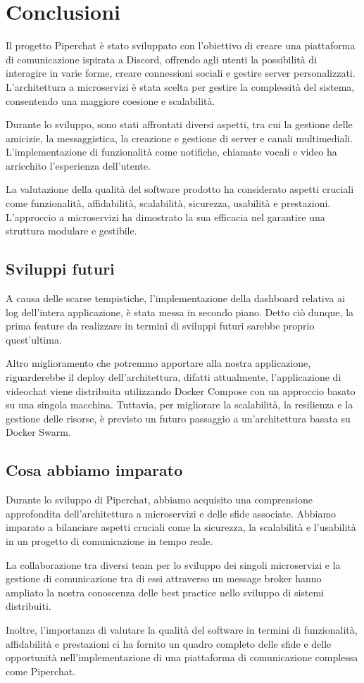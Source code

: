 \section{Conclusioni}

Il progetto Piperchat è stato sviluppato con l'obiettivo di creare una piattaforma di comunicazione ispirata a Discord, offrendo agli utenti la possibilità di interagire in varie forme, creare connessioni sociali e gestire server personalizzati. L'architettura a microservizi è stata scelta per gestire la complessità del sistema, consentendo una maggiore coesione e scalabilità.

Durante lo sviluppo, sono stati affrontati diversi aspetti, tra cui la gestione delle amicizie, la messaggistica, la creazione e gestione di server e canali multimediali. L'implementazione di funzionalità come notifiche, chiamate vocali e video ha arricchito l'esperienza dell'utente.

La valutazione della qualità del software prodotto ha considerato aspetti cruciali come funzionalità, affidabilità, scalabilità, sicurezza, usabilità e prestazioni. L'approccio a microservizi ha dimostrato la sua efficacia nel garantire una struttura modulare e gestibile.

\subsection{Sviluppi futuri}
A causa delle scarse tempistiche, l'implementazione della dashboard relativa ai log dell'intera applicazione, è stata messa in secondo piano.
Detto ciò dunque, la prima feature da realizzare in termini di sviluppi futuri sarebbe proprio quest'ultima.

Altro miglioramento che potremmo apportare alla nostra applicazione, riguarderebbe il deploy dell'architettura, difatti attualmente, l'applicazione di videochat viene distribuita utilizzando Docker Compose con un approccio basato su una singola macchina. Tuttavia, per migliorare la scalabilità, la resilienza e la gestione delle risorse, è previsto un futuro passaggio a un'architettura basata su Docker Swarm.


\subsection{Cosa abbiamo imparato}

Durante lo sviluppo di Piperchat, abbiamo acquisito una comprensione approfondita dell'architettura a microservizi e delle sfide associate. Abbiamo imparato a bilanciare aspetti cruciali come la sicurezza, la scalabilità e l'usabilità in un progetto di comunicazione in tempo reale.

La collaborazione tra diversi team per lo sviluppo dei singoli microservizi e la gestione di comunicazione tra di essi attraverso un message broker hanno ampliato la nostra conoscenza delle best practice nello sviluppo di sistemi distribuiti.

Inoltre, l'importanza di valutare la qualità del software in termini di funzionalità, affidabilità e prestazioni ci ha fornito un quadro completo delle sfide e delle opportunità nell'implementazione di una piattaforma di comunicazione complessa come Piperchat.
